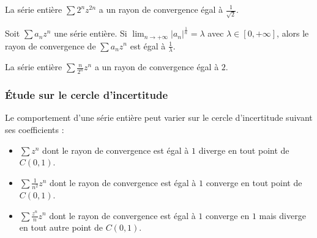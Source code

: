 	\begin{example}
		La série entière $\sum 2^n z^{2n}$ a un rayon de convergence égal à $\frac{1}{\sqrt{2}}$.
	\end{example}

	\begin{corollary}
		Soit $\sum a_n z^n$ une série entière. Si $\lim_{n \rightarrow +\infty} \left| a_n \right|^{\frac{1}{n}} = \lambda$ avec $\lambda \in [0, +\infty]$, alors le rayon de convergence de $\sum a_n z^n$ est égal à $\frac{1}{\lambda}$.
	\end{corollary}

	\begin{example}
		La série entière $\sum \frac{n}{2^n} z^n$ a un rayon de convergence égal à $2$.
	\end{example}

	\subsubsection{Étude sur le cercle d'incertitude}


	\begin{example}
		Le comportement d'une série entière peut varier sur le cercle d'incertitude suivant ses coefficients :
		\begin{itemize}
			\item $\sum z^n$ dont le rayon de convergence est égal à $1$ diverge en tout point de $C(0,1)$.
			\item $\sum \frac{1}{n^2} z^n$ dont le rayon de convergence est égal à $1$ converge en tout point de $C(0,1)$.
			\item $\sum \frac{z^n}{n} z^n$ dont le rayon de convergence est égal à $1$ converge en $1$ mais diverge en tout autre point de $C(0,1)$.
		\end{itemize}
	\end{example}


